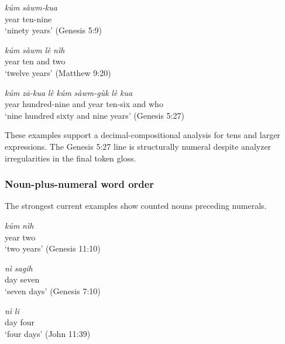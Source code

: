 \documentclass[
  11pt,
  a4paper,
]{article}
\newcommand{\tdimword}[1]{\textit{#1}}
\newcommand{\glossquote}[1]{`#1'}
\begin{document}
\begin{exe}
\ex \label{ex:num-sawmkua}
\gll \tdimword{kúm} \tdimword{sàwm-kua} \\
     year ten-nine \\
\glt \glossquote{ninety years} (Genesis 5:9)
\end{exe}

\begin{exe}
\ex \label{ex:num-kum-sawm-le-nih}
\gll \tdimword{kúm} \tdimword{sàwm} \tdimword{lè} \tdimword{nìh} \\
     year ten and two \\
\glt \glossquote{twelve years} (Matthew 9:20)
\end{exe}

\begin{exe}
\ex \label{ex:num-large}
\gll \tdimword{kúm} \tdimword{zā-kua} \tdimword{lè} \tdimword{kúm} \tdimword{sàwm-gùk} \tdimword{lè} \tdimword{kua} \\
     year hundred-nine and year ten-six and who \\
\glt \glossquote{nine hundred sixty and nine years} (Genesis 5:27)
\end{exe}

These examples support a decimal-compositional analysis for tens and
larger expressions. The Genesis 5:27 line is structurally numeral
despite analyzer irregularities in the final token gloss.

\subsubsection{Noun-plus-numeral word
order}\label{noun-plus-numeral-word-order}

The strongest current examples show counted nouns preceding numerals.

\begin{exe}
\ex \label{ex:num-kum-nih}
\gll \tdimword{kúm} \tdimword{nìh} \\
     year two \\
\glt \glossquote{two years} (Genesis 11:10)
\end{exe}

\begin{exe}
\ex \label{ex:num-ni-sagih}
\gll \tdimword{nì} \tdimword{sagih} \\
     day seven \\
\glt \glossquote{seven days} (Genesis 7:10)
\end{exe}

\begin{exe}
\ex \label{ex:num-ni-li}
\gll \tdimword{nì} \tdimword{li} \\
     day four \\
\glt \glossquote{four days} (John 11:39)
\end{exe}
\end{document}
